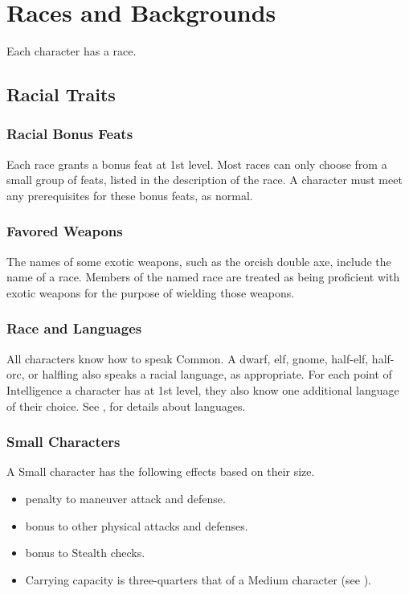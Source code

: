 \chapter{Races and Backgrounds}

Each character has a race.

\section{Racial Traits}

\subsection{Racial Bonus Feats}
Each race grants a bonus feat at 1st level. Most races can only choose from a small group of feats, listed in the description of the race. A character must meet any prerequisites for these bonus feats, as normal.

\subsection{Favored Weapons}
The names of some exotic weapons, such as the orcish double axe, include the name of a race. Members of the named race are treated as being proficient with exotic weapons for the purpose of wielding those weapons.

\subsection{Race and Languages}
All characters know how to speak Common. A dwarf, elf, gnome, half-elf, half-orc, or halfling also speaks a racial language, as appropriate. For each point of Intelligence a character has at 1st level, they also know one additional language of their choice. See , for details about languages.

\subsection{Small Characters}\label{Small Characters}
A Small character has the following effects based on their size.
  \begin{itemize} 
    \item {} penalty to maneuver attack and defense.
    \item {} bonus to other physical attacks and defenses.
    \item {} bonus to Stealth checks.
    \item Carrying capacity is three-quarters that of a Medium character (see ).
  \end{itemize}

